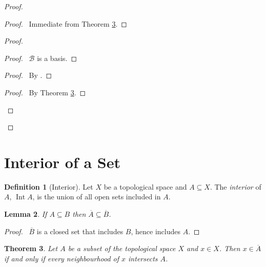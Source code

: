 \documentclass{report}
\let\qed\relax
\newtheorem{lm}{Lemma}[section]
\newtheorem{thm}[lm]{Theorem}
\theoremstyle{definition}
\newtheorem{df}[lm]{Definition}
\newcommand{\Int}{\ensuremath{\operatorname{Int}}}
\begin{document}
  \begin{proof}
    \pf
    \begin{proof}
      \pf\ Immediate from Theorem \ref{thm:topology:closure:neighbourhoods}.
    \end{proof}
    \begin{proof}
      \begin{proof}
        \pf\ $\mathcal{B}$ is a basis.
      \end{proof}
      \begin{proof}
        \pf\ By .
      \end{proof}
      \qedstep
      \begin{proof}
        \pf\ By Theorem \ref{thm:topology:closure:neighbourhoods}.
      \end{proof}
    \end{proof}
    \qed
  \end{proof}

  \section{Interior of a Set}

  \begin{df}[Interior]
    Let $X$ be a topological space and $A \subseteq X$.
    The \emph{interior} of $A$, $\Int A$, is the union of all open sets
    included
    in $A$.
  \end{df}

  \begin{lm}
    If $A \subseteq B$ then $\overline{A} \subseteq \overline{B}$.
  \end{lm}

  \begin{proof}
    \pf\ $\overline{B}$ is a closed set that includes $B$, hence includes $A$.
    \qed
  \end{proof}

  \begin{thm}
    \label{thm:topology:closure:neighbourhoods}
    Let $A$ be a subset of the topological space $X$ and $x \in X$. Then $x \in
    \overline{A}$ if and only if every neighbourhood of $x$ intersects $A$.
  \end{thm}
\end{document}
